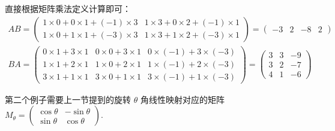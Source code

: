 \begin{solution}
    直接根据矩阵乘法定义计算即可：
    \begin{gather*}
        AB = \begin{pmatrix}
            1 \times 0 + 0 \times 1 + (-1) \times 3 & 1 \times 3 + 0 \times 2 + (-1) \times 1 \\
            1 \times 0 + 1 \times 1 + (-3) \times 3 & 1 \times 3 + 1 \times 2 + (-3) \times 1
        \end{pmatrix} = \begin{pmatrix}
                -3 & 2 & -8 & 2
            \end{pmatrix} \\
        BA = \begin{pmatrix}
            0 \times 1 + 3 \times 1 & 0 \times 0 + 3 \times 1 & 0 \times (-1) + 3 \times (-3) \\
            1 \times 1 + 2 \times 1 & 1 \times 0 + 2 \times 1 & 1 \times (-1) + 2 \times (-3) \\
            3 \times 1 + 1 \times 1 & 3 \times 0 + 1 \times 1 & 3 \times (-1) + 1 \times (-3)
        \end{pmatrix} = \begin{pmatrix}
                3 & 3 & -9 \\
                3 & 2 & -7 \\
                4 & 1 & -6
            \end{pmatrix}
    \end{gather*}
\end{solution}

第二个例子需要上一节提到的旋转 $\theta$ 角线性映射对应的矩阵 $M_{\theta}=\begin{pmatrix}
        \cos\theta & -\sin\theta \\
        \sin\theta & \cos\theta
\end{pmatrix}$.

